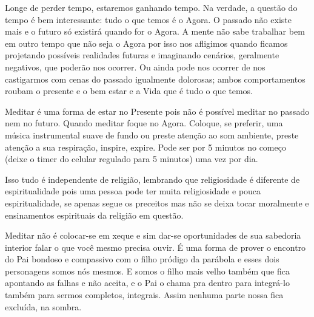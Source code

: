 \emdash{}Longe de perder tempo, estaremos ganhando tempo. Na verdade, a questão do tempo é bem interessante: tudo o que temos é o Agora. O passado não existe mais e o futuro só existirá quando for o Agora. A mente não sabe trabalhar bem em outro tempo que não seja o Agora por isso nos afligimos quando ficamos projetando possíveis realidades futuras e imaginando cenários, geralmente negativos, que poderão nos ocorrer. Ou ainda pode nos ocorrer de nos castigarmos com cenas do passado igualmente dolorosas; ambos comportamentos roubam o presente e o bem estar e a Vida que é tudo o que temos.

\emdash{}Meditar é uma forma de estar no Presente  pois não é possível meditar no passado nem no futuro. Quando meditar foque no Agora. Coloque, se preferir, uma música instrumental suave de fundo ou preste atenção ao som ambiente, preste atenção a sua respiração, inspire, expire. Pode ser por 5 minutos no começo (deixe o timer do celular regulado para 5 minutos) uma vez por dia.

\emdash{}Isso tudo é independente de religião, lembrando que religiosidade é diferente de espiritualidade pois uma pessoa pode ter muita religiosidade e pouca espiritualidade, se apenas segue os preceitos mas não se deixa tocar moralmente e ensinamentos espirituais da religião em questão. 

\emdash{}Meditar não é colocar-se em xeque e sim dar-se oportunidades de sua sabedoria interior falar o que você mesmo precisa ouvir. É uma forma de prover o encontro do Pai bondoso e compassivo com o filho pródigo da parábola e esses dois personagens somos nós mesmos. E somos o filho mais velho também que fica apontando as falhas e não aceita, e o Pai o chama pra dentro para integrá-lo também para sermos completos, integrais. Assim nenhuma parte nossa fica excluída, na sombra.